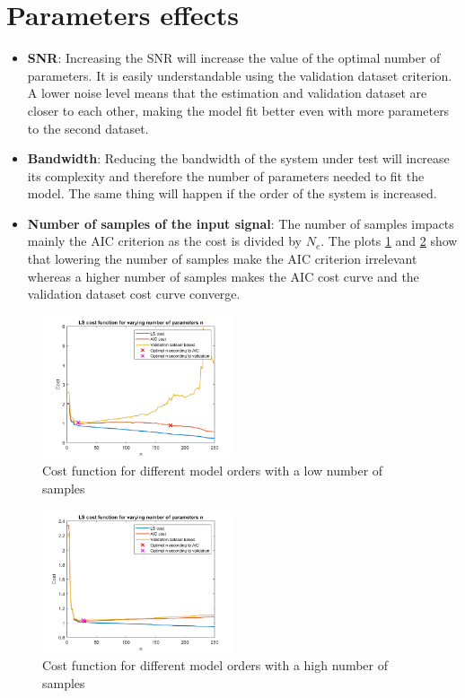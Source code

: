 \documentclass[10pt,twocolumn]{article}
\begin{document}
\section{Parameters effects}

\begin{itemize}
    \item \textbf{SNR}: Increasing the SNR will increase the value of the optimal number of parameters. It is easily understandable using the validation dataset criterion. A lower noise level means that the estimation and validation dataset are closer to each other, making the model fit better even with more parameters to the second dataset.
    \item \textbf{Bandwidth}: Reducing the bandwidth of the system under test will increase its complexity and therefore the number of parameters needed to fit the model. The same thing will happen if the order of the system is increased. 
    \item \textbf{Number of samples of the input signal}: The number of samples impacts mainly the AIC criterion as the cost is divided by $N_e$. The plots \ref{fig:lowSamples} and \ref{fig:highSamples} show that lowering the number of samples make the AIC criterion irrelevant whereas a higher number of samples makes the AIC cost curve and the validation dataset cost curve converge.
\end{itemize}

\begin{figure}
    \centering
    \includegraphics[width=0.5\textwidth]{pic/lowSamples.png}
    \caption{Cost function for different model orders with a low number of samples}
    \label{fig:lowSamples}
\end{figure}

\begin{figure}
    \centering
    \includegraphics[width=0.5\textwidth]{pic/highSamples.png}
    \caption{Cost function for different model orders with a high number of samples}
    \label{fig:highSamples}
\end{figure}
\end{document}

